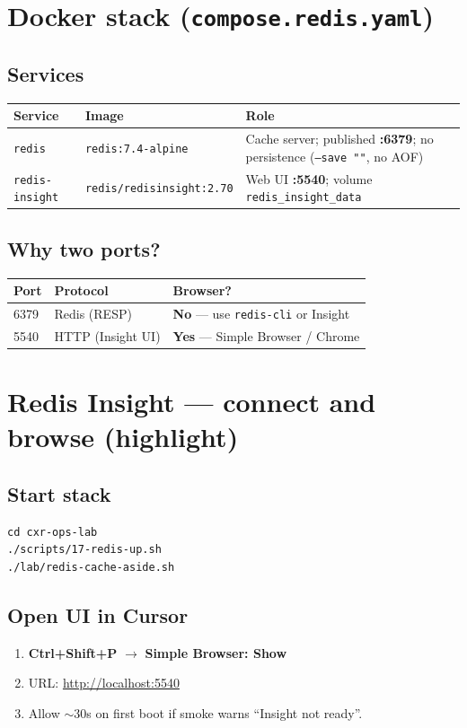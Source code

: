 \documentclass[11pt,a4paper]{report}
\begin{document}
\chapter{Docker stack (\texttt{compose.redis.yaml})}

\section{Services}

\begin{longtable}{@{}p{3.2cm}p{4cm}p{7cm}@{}}
\toprule
Service & Image & Role \\
\midrule
\endhead
\texttt{redis} & \texttt{redis:7.4-alpine} & Cache server; published \textbf{:6379}; no persistence (\texttt{--save ""}, no AOF) \\
\texttt{redis-insight} & \texttt{redis/redisinsight:2.70} & Web UI \textbf{:5540}; volume \texttt{redis\_insight\_data} \\
\bottomrule
\end{longtable}

\section{Why two ports?}

\begin{center}
\begin{tabular}{lll}
\toprule
Port & Protocol & Browser? \\
\midrule
6379 & Redis (RESP) & \textbf{No} --- use \texttt{redis-cli} or Insight \\
5540 & HTTP (Insight UI) & \textbf{Yes} --- Simple Browser / Chrome \\
\bottomrule
\end{tabular}
\end{center}

\chapter{Redis Insight --- connect and browse (highlight)}

\section{Start stack}
\begin{lstlisting}[style=bash]
cd cxr-ops-lab
./scripts/17-redis-up.sh
./lab/redis-cache-aside.sh
\end{lstlisting}

\section{Open UI in Cursor}
\begin{enumerate}
  \item \textbf{Ctrl+Shift+P} $\rightarrow$ \textbf{Simple Browser: Show}
  \item URL: \url{http://localhost:5540}
  \item Allow $\sim$30s on first boot if smoke warns ``Insight not ready''.
\end{enumerate}
\end{document}
